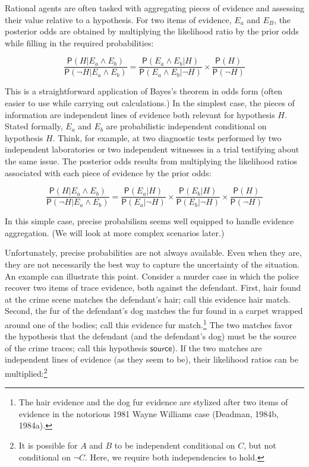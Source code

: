 \documentclass[
  letterpaper,
  DIV=11,
  numbers=noendperiod]{scrartcl}
\newcommand{\pr}[1]{\mathsf{P}(#1)}
\begin{document}
Rational agents are often tasked with aggregating pieces of evidence and
assessing their value relative to a hypothesis. For two items of
evidence, \(E_a\) and \(E_B\), the posterior odds are obtained by
multiplying the likelihood ratio by the prior odds while filling in the
required probabilities:

\[
\frac{\pr{H \vert E_a \wedge E_b}}{\pr{\neg H \vert E_a \wedge E_b}} = \frac{\pr{E_a \wedge E_b \vert H}}{\pr{E_a \wedge E_b \vert \neg H}} \times \frac{\pr{H}}{\pr{\neg H}} 
\]

\noindent This is a straightforward application of Bayes's theorem in
odds form (often easier to use while carrying out calculations.) In the
simplest case, the pieces of information are independent lines of
evidence both relevant for hypothesis \(H\). Stated formally, \(E_a\)
and \(E_b\) are probabilistic independent conditional on hypothesis
\(H\). Think, for example, at two diagnostic tests performed by two
independent laboratories or two independent witnesses in a trial
testifying about the same issue. The posterior odds results from
multiplying the likelihood ratios associated with each piece of evidence
by the prior odds:

\[
\frac{\pr{H \vert E_a \wedge E_b}}{\pr{\neg H \vert E_a \wedge E_b}} = \frac{\pr{E_a \vert H}}{\pr{E_a \vert \neg H}}\times \frac{\pr{E_b \vert H}}{\pr{E_b \vert \neg H}} \times \frac{\pr{H}}{\pr{\neg H}} 
\]

\noindent In this simple case, precise probabilism seems well equipped
to handle evidence aggregation. (We will look at more complex scenarios
later.)

Unfortunately, precise probabilities are not always available. Even when
they are, they are not necessarily the best way to capture the
uncertainty of the situation. An example can illustrate this point.
Consider a murder case in which the police recover two items of trace
evidence, both against the defendant. First, hair found at the crime
scene matches the defendant's hair; call this evidence
\textsf{hair match}. Second, the fur of the defendant's dog matches the
fur found in a carpet wrapped around one of the bodies; call this
evidence \textsf{fur match}.\footnote{The hair evidence and the dog fur
  evidence are stylized after two items of evidence in the notorious
  1981 Wayne Williams case (Deadman, 1984b, 1984a).} The two matches
favor the hypothesis that the defendant (and the defendant's dog) must
be the source of the crime traces; call this hypothesis
\(\mathsf{source}\)). If the two matches are independent lines of
evidence (as they seem to be), their likelihood ratios can be
multiplied:\footnote{It is possible for \(A\) and \(B\) to be
  independent conditional on \(C\), but not conditional on \(\neg C\).
  Here, we require both independencies to hold.}
\end{document}
